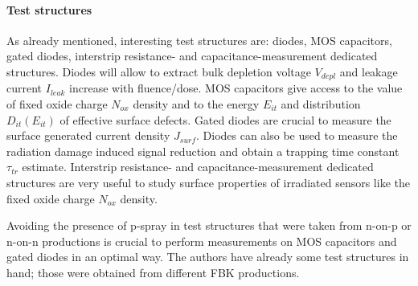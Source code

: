 \documentclass[dvips,12pt]{article}
\begin{document}
\paragraph{Test structures} As already mentioned, interesting test structures are: diodes, MOS 
capacitors, gated diodes, interstrip resistance- and 
capacitance-measurement dedicated structures.
Diodes will allow to extract bulk depletion voltage $V_{depl}$ and leakage current $I_{leak}$
 increase with fluence/dose. 
MOS capacitors give access to the value of fixed oxide charge $N_{ox}$ density and to the energy 
 $E_{it}$ and distribution  $D_{it}(E_{it})$ of effective surface defects. Gated diodes 
are crucial to measure the surface generated current density $J_{surf}$. 
Diodes can also be used to measure the radiation damage induced signal reduction and obtain 
a trapping time constant $\tau_{tr}$ estimate. Interstrip resistance- and 
capacitance-measurement dedicated structures are very useful to study surface properties 
of irradiated sensors like the fixed oxide charge $N_{ox}$ density.

\noindent Avoiding the presence of p-spray in test structures that were taken from
 n-on-p or n-on-n productions is crucial to perform measurements on MOS 
capacitors and gated diodes in an optimal way.
\noindent The authors have already some test structures in hand; those  were obtained from different 
FBK productions. 
\end{document}
